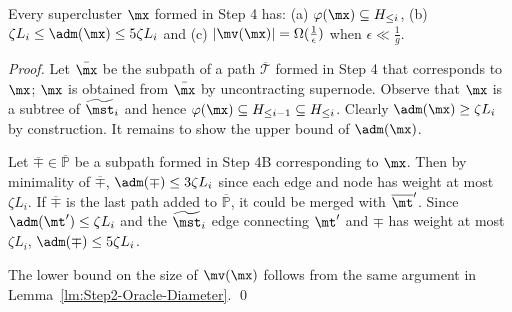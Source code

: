 

\begin{lemma}\label{lm:Step4-Diam-Oracle}
		Every supercluster $\mx$ formed in Step 4 has: (a) $\varphi(\mx)\subseteq H_{\leq i}$, (b) $\zeta L_i \leq \adm(\mx)\leq 5\zeta L_i$  and (c) $|\mv(\mx)| = \Omega(\frac{1}{\epsilon})$ when $\epsilon \ll \frac{1}{g}$.
\end{lemma}
\begin{proof}
Let $\bar{\mx}$ be the subpath of a path $\overline{\mathcal{T}}$ formed in Step 4 that corresponds to $\mx$; $\mx$ is obtained from $\bar{\mx}$  by uncontracting supernode. Observe that $\mx$ is a subtree of $\widetilde{\mst}_i$ and hence $\varphi(\mx)\subseteq H_{\leq i-1} \subseteq H_{\leq i}$. Clearly $\adm(\mx)\geq \zeta L_i$ by construction. It remains to show the upper bound of $\adm(\mx)$.

Let $\overline{\mp} \in \overline{\mathbb{P}}$ be a subpath formed in Step 4B corresponding to $\mx$. Then by minimality of $\overline{\mp}$, $\adm(\mp)\leq  3\zeta L_i$ since each edge and node has weight at most $\zeta L_i$. If $\overline{\mp}$ is the last path added to $ \overline{\mathbb{P}}$, it could be merged with $\overline{\mt}'$. Since $\adm(\mt')\leq \zeta L_i$ and the $\widetilde{\mst}_i$ edge connecting $\mt'$ and $\mp$ has weight at most $\zeta L_i$, $\adm(\mp) \leq 5\zeta L_i$.

 The lower bound on the size of $\mv(\mx)$ follows from the same argument in Lemma~\ref{lm:Step2-Oracle-Diameter}.  \qed

\end{proof}



